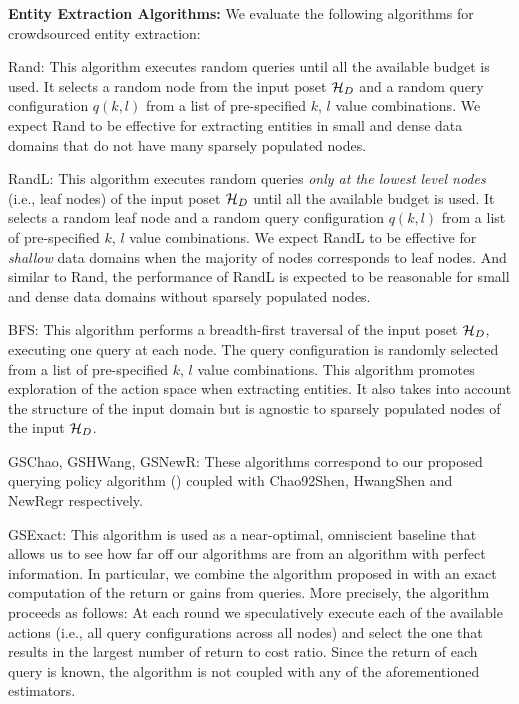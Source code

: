 \vspace{5pt}\noindent\textbf{Entity Extraction Algorithms:} We evaluate the following algorithms for crowdsourced entity extraction:
\squishlist
\item Rand: This algorithm executes random queries until all the available budget is used. It selects a random node from the input poset $\mathcal{H}_D$ and a random query configuration $q(k,l)$ from a list of pre-specified $k$, $l$ value combinations. We expect Rand to be effective for extracting entities in small and dense data domains that do not have many sparsely populated nodes.
\item RandL: This algorithm executes random queries {\em only at the lowest level nodes} (i.e., leaf nodes) of the input poset $\mathcal{H}_D$ until all the available budget is used. It selects a random leaf node and a random query configuration $q(k,l)$ from a list of pre-specified $k$, $l$ value combinations. We expect RandL to be effective for {\em shallow} data domains when the majority of nodes corresponds to leaf nodes. And similar to Rand, the performance of RandL is expected to be reasonable for small and dense data domains without sparsely populated nodes.
\item BFS: This algorithm performs a breadth-first traversal of the input poset $\mathcal{H}_D$, executing one query at each node. The query configuration is randomly selected from a list of pre-specified $k$, $l$ value combinations. This algorithm promotes exploration of the action space when extracting entities. It also takes into account the structure of the input domain but is agnostic to sparsely populated nodes of the input $\mathcal{H}_D$.
\item GSChao, GSHWang, GSNewR: These algorithms correspond to our proposed querying policy algorithm () coupled with Chao92Shen, HwangShen and NewRegr respectively.
\item GSExact: This algorithm is used as a near-optimal, omniscient baseline that allows us to see how far off our algorithms are from an algorithm with perfect information. In particular, we combine the algorithm proposed in  with an exact computation of the return or gains from queries. More precisely, the algorithm proceeds as follows: At each round we speculatively execute each of the available actions (i.e., all query configurations across all nodes) and select the one that results in the largest number of return to cost ratio. Since the return of each query is known, the algorithm is not coupled with any of the aforementioned estimators.
\squishend


